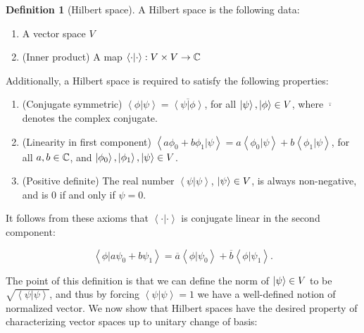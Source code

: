 \documentclass{article}
\theoremstyle{definition}
\newtheorem*{definition}{Definition}
\numberwithin{figure}{section}
\begin{document}
\begin{definition}[Hilbert space] A Hilbert space is the following data:

\begin{enumerate}
\item A vector space $V$
\item (Inner product) A map $\left<\cdot |\cdot \right>:V\times V\to \mathbb{C}$
\end{enumerate}

Additionally, a Hilbert space is required to satisfy the following properties:

\begin{enumerate}
\item (Conjugate symmetric) $\left<\phi |\psi \right>=\overline{\left<\psi| \phi\right>}$, for all $\left|\psi\right>,\left|\phi\right>\in V$, where $\overline{\cdot}$ denotes the complex conjugate.
\item (Linearity in first component) $\left<a\phi_0+b\phi_1|\psi\right>=a\left<\phi_0|\psi\right>+b\left<\phi_1|\psi\right>$, for all $a,b\in \mathbb{C}$, and $\left|\phi_0\right>,\left|\phi_1\right>,\left|\psi\right>\in V$.
\item (Positive definite) The real number $\left<\psi|\psi\right>$, $\left|\psi\right>\in V$, is always non-negative, and is $0$ if and only if $\psi=0$.
\end{enumerate}

\raggedleft\qedsymbol{}
\end{definition}

It follows from these axioms that $\left<\cdot | \cdot \right>$ is conjugate linear in the second component:

$$\left<\phi|a\psi_0+b\psi_1\right>=\overline{a}\left<\phi|\psi_0\right>+\overline{b}\left<\phi|\psi_1\right>.$$

The point of this definition is that we can define the norm of $\left|\psi\right>\in V$ to be $\sqrt{\left<\psi|\psi\right>}$, and thus by forcing $\left<\psi |\psi\right>=1$ we have a well-defined notion of normalized vector. We now show that Hilbert spaces have the desired property of characterizing vector spaces up to unitary change of basis:
\end{document}
